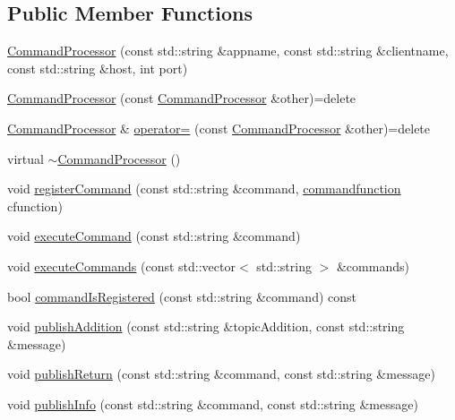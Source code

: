 \subsection*{Public Member Functions}
\begin{DoxyCompactItemize}
\item 
\hyperlink{class_command_processor_a053c5d39a7c42ddaeeab11467a052e98}{Command\+Processor} (const std\+::string \&appname, const std\+::string \&clientname, const std\+::string \&host, int port)
\item 
\hyperlink{class_command_processor_ad3ed59d0f22d979f2010a541a08c1ee3}{Command\+Processor} (const \hyperlink{class_command_processor}{Command\+Processor} \&other)=delete
\item 
\hyperlink{class_command_processor}{Command\+Processor} \& \hyperlink{class_command_processor_a1068633e1f6af69a67de06f10d8dba3a}{operator=} (const \hyperlink{class_command_processor}{Command\+Processor} \&other)=delete
\item 
virtual \hyperlink{class_command_processor_a8b975af12657aab33323c1b6c5bb2961}{$\sim$\+Command\+Processor} ()
\item 
void \hyperlink{class_command_processor_a72e15bc0082d628bd05aacedd5aa7ee0}{register\+Command} (const std\+::string \&command, \hyperlink{_command_processor_8h_a28db7178a71eff1027c055c9b19f6215}{commandfunction} cfunction)
\item 
void \hyperlink{class_command_processor_a3a830f1939e458f31f0cd2d42855609f}{execute\+Command} (const std\+::string \&command)
\item 
void \hyperlink{class_command_processor_a9c23c88fe12e643092993a8bb2aa0528}{execute\+Commands} (const std\+::vector$<$ std\+::string $>$ \&commands)
\item 
bool \hyperlink{class_command_processor_a11c9458174f6909a46b20d26bc489f68}{command\+Is\+Registered} (const std\+::string \&command) const 
\item 
void \hyperlink{class_command_processor_a88ad204c02a79887698c6abc93729a2d}{publish\+Addition} (const std\+::string \&topic\+Addition, const std\+::string \&message)
\item 
void \hyperlink{class_command_processor_ae97c2e58deecce8bd6dac0d081d73f03}{publish\+Return} (const std\+::string \&command, const std\+::string \&message)
\item 
void \hyperlink{class_command_processor_a0f5c17ab23203abee8a48c82f3338a28}{publish\+Info} (const std\+::string \&command, const std\+::string \&message)
\item 

\end{DoxyCompactItemize}
